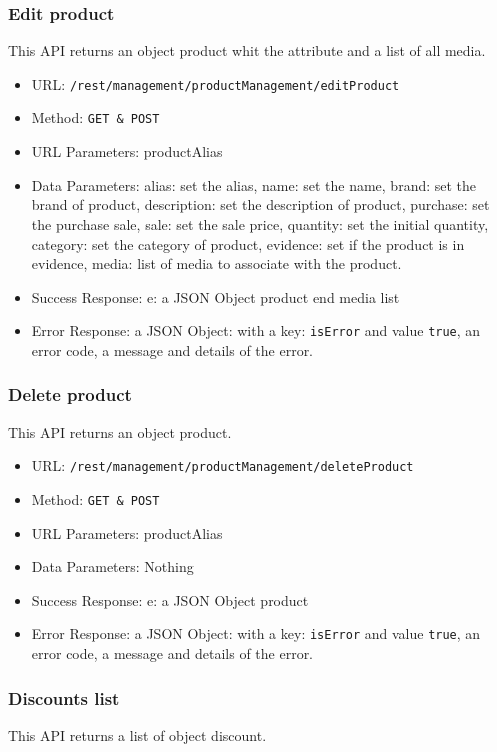 \subsubsection*{Edit product}
This API returns an object product whit the attribute and a list of all media.

\begin{itemize}
    \item URL: \texttt{/rest/management/productManagement/editProduct}
    \item Method: \texttt{{GET \& POST}}
    \item URL Parameters: productAlias
    \item Data Parameters: alias: set the alias, name: set the name, brand: set the brand of product, description: set the description of product, purchase: set the purchase sale, sale: set the sale price, quantity: set the initial quantity, category: set the category of product, evidence: set if the product is in evidence, media: list of media to associate with the product.
    \item Success Response: e: a JSON Object product end media list
    \item Error Response: a JSON Object: with a key: \texttt{isError}  and value \texttt{true}, an error code, a message and details of the error.
\end{itemize}



\subsubsection*{Delete product}
This API returns an object product.

\begin{itemize}
    \item URL: \texttt{/rest/management/productManagement/deleteProduct}
    \item Method: \texttt{{GET \& POST}}
    \item URL Parameters: productAlias
    \item Data Parameters: Nothing
    \item Success Response: e: a JSON Object product
    \item Error Response: a JSON Object: with a key: \texttt{isError}  and value \texttt{true}, an error code, a message and details of the error.
\end{itemize}


\subsubsection*{Discounts list}
This API returns a list of object discount.

